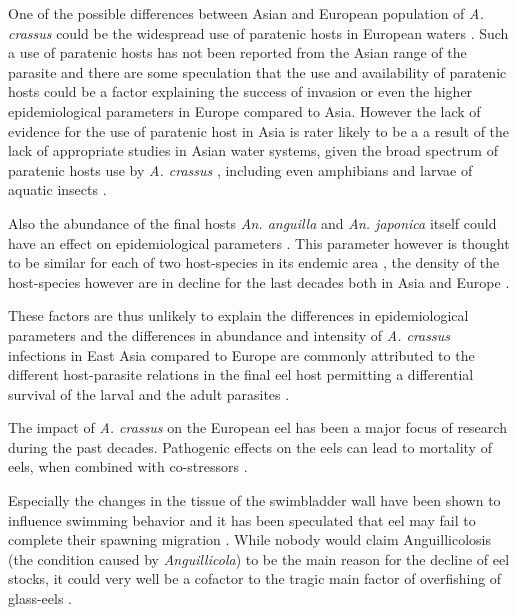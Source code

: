 One of the possible differences between Asian and European population
of \textit{A. crassus} could be the widespread use of paratenic hosts
in European waters \cite{thomas_paratenic_1992,
  pietrock_dynamics_2002}. Such a use of paratenic hosts has not been
reported from the Asian range of the parasite and there are some
speculation that the use and availability of paratenic hosts could be
a factor explaining the success of invasion or even the higher
epidemiological parameters in Europe compared to Asia. However the
lack of evidence for the use of paratenic host in Asia is rater likely
to be a a result of the lack of appropriate studies in Asian water
systems, given the broad spectrum of paratenic hosts use by
\textit{A. crassus}
\cite{pietrock_dynamics_2002,rolbiecki_acndab_2004,szkely_dynamics_1995},
including even amphibians and larvae of aquatic insects
\cite{moravec_amphibians_1998}.

Also the abundance of the final hosts \textit{An. anguilla} and
\textit{An. japonica} itself could have an effect on epidemiological
parameters \cite{schabuss_dynamics_2005}. This parameter however is
thought to be similar for each of two host-species in its endemic area
\cite{tesch1983aal}, the density of the host-species however are in
decline for the last decades both in Asia and Europe
\cite{pmid12713741}.

These factors are thus unlikely to explain the differences in
epidemiological parameters and the differences in abundance and
intensity of \textit{A. crassus} infections in East Asia compared to
Europe are commonly attributed to the different host-parasite
relations in the final eel host permitting a differential survival of
the larval and the adult parasites \cite{knopf_differences_2004,
  knopf_swimbladder_2006}.

The impact of \textit{A. crassus} on the European eel has been a major
focus of research during the past decades. Pathogenic effects on the
eels can lead to mortality of eels, when combined with co-stressors
\cite{gollock_physiological_2005}.

Especially the changes in the tissue of the swimbladder wall have been
shown to influence swimming behavior and it has been speculated that
eel may fail to complete their spawning migration
\cite{palstra_swimming_2007}. While nobody would claim Anguillicolosis
(the condition caused by \textit{Anguillicola}) to be the main reason
for the decline of eel stocks, it could very well be a cofactor
\cite{sures_science_letter} to the tragic main factor of overfishing
of glass-eels \cite{pmid12713741}.

